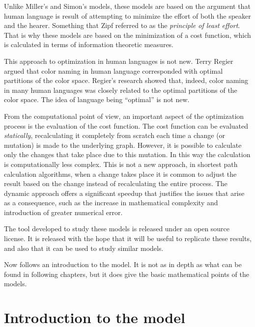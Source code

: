 Unlike Miller's and Simon's models, these models are based on the argument that human language is result of attempting to minimize the effort of both the speaker and the hearer. \cite{Ferrer2003a} \cite{Zipf1949a} Something that Zipf referred to as the \emph{principle of least effort}. That is why these models are based on the minimization of a cost function, which is calculated in terms of information theoretic measures.

This approach to optimization in human languages is not new.
Terry Regier argued \cite{Regier2007a} that color naming in human language corresponded with optimal partitions of the color space.
Regier's research showed that, indeed, color naming in many human languages was closely related to the optimal partitions of the color space.
The idea of language being ``optimal'' is not new.

From the computational point of view, an important aspect of the optimization process is the evaluation of the cost function.
The cost function can be evaluated \emph{statically}, recalculating it completely from scratch each time a change (or mutation) is made to the underlying graph.
However, it is possible to calculate only the changes that take place due to this mutation.
In this way the calculation is computationally less complex.
This is not a new approach, in shortest path calculation algorithms, when a change takes place it is common to adjust the result based on the change instead of recalculating the entire process. \cite{Buriol2003a}
The dynamic approach offers a significant speedup that justifies the issues that arise as a consequence, such as the increase in mathematical complexity and introduction of greater numerical error.


The tool developed to study these models is released under an open source license.
It is released with the hope that it will be useful to replicate these results, and also that it can be used to study similar models.


Now follows an introduction to the model.
It is not as in depth as what can be found in following chapters, but it does give the basic mathematical points of the models.

\section{Introduction to the model}
\label{sec:introduction_model}

